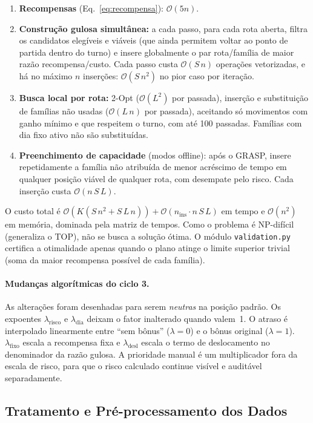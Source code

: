 \documentclass[11pt,a4paper]{article}
\begin{document}
\begin{enumerate}
    \item \textbf{Recompensas} (Eq.~\ref{eq:recompensa}): $\mathcal{O}(5n)$.
    \item \textbf{Construção gulosa simultânea:} a cada passo, para cada rota aberta, filtra os candidatos elegíveis e viáveis (que ainda permitem voltar ao ponto de partida dentro do turno) e insere globalmente o par rota/família de maior razão recompensa/custo. Cada passo custa $\mathcal{O}(S\,n)$ operações vetorizadas, e há no máximo $n$ inserções: $\mathcal{O}(S\,n^2)$ no pior caso por iteração.
    \item \textbf{Busca local por rota:} 2-Opt ($\mathcal{O}(L^2)$ por passada), inserção e substituição de famílias não usadas ($\mathcal{O}(L\,n)$ por passada), aceitando só movimentos com ganho mínimo e que respeitem o turno, com até 100 passadas. Famílias com dia fixo ativo não são substituídas.
    \item \textbf{Preenchimento de capacidade} (modos offline): após o GRASP, insere repetidamente a família não atribuída de menor acréscimo de tempo em qualquer posição viável de qualquer rota, com desempate pelo risco. Cada inserção custa $\mathcal{O}(n\,S\,L)$.
\end{enumerate}
O custo total é $\mathcal{O}(K(S\,n^2 + S\,L\,n)) + \mathcal{O}(n_{\text{ins}} \cdot n\,S\,L)$ em tempo e $\mathcal{O}(n^2)$ em memória, dominada pela matriz de tempos. Como o problema é NP-difícil (generaliza o TOP), não se busca a solução ótima. O módulo \texttt{validation.py} certifica a otimalidade apenas quando o plano atinge o limite superior trivial (soma da maior recompensa possível de cada família).

\paragraph{Mudanças algorítmicas do ciclo 3.} As alterações foram desenhadas para serem \emph{neutras} na posição padrão. Os expoentes $\lambda_{\text{risco}}$ e $\lambda_{\text{dia}}$ deixam o fator inalterado quando valem~1. O atraso é interpolado linearmente entre ``sem bônus'' ($\lambda=0$) e o bônus original ($\lambda=1$). $\lambda_{\text{fixo}}$ escala a recompensa fixa e $\lambda_{\text{desl}}$ escala o termo de deslocamento no denominador da razão gulosa. A prioridade manual é um multiplicador fora da escala de risco, para que o risco calculado continue visível e auditável separadamente.

\subsection{Tratamento e Pré-processamento dos Dados}
\end{document}
